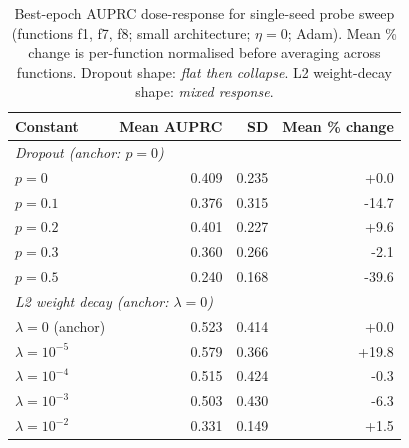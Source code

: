\begin{table}[htbp]
\centering
\caption{Best-epoch AUPRC dose-response for single-seed probe sweep (functions f1, f7, f8; small architecture; $\eta=0$; Adam). Mean \% change is per-function normalised before averaging across functions. Dropout shape: \textit{flat then collapse}. L2 weight-decay shape: \textit{mixed response}.}
\label{tab:dose_response}
\begin{tabular}{lrrr}
\toprule
Constant & Mean AUPRC & SD & Mean \% change \\
\midrule
\multicolumn{4}{l}{\textit{Dropout (anchor: $p=0$)}} \\
\quad $p = 0$ & 0.409 & 0.235 & +0.0 \\
\quad $p = 0.1$ & 0.376 & 0.315 & -14.7 \\
\quad $p = 0.2$ & 0.401 & 0.227 & +9.6 \\
\quad $p = 0.3$ & 0.360 & 0.266 & -2.1 \\
\quad $p = 0.5$ & 0.240 & 0.168 & -39.6 \\
\midrule
\multicolumn{4}{l}{\textit{L2 weight decay (anchor: $\lambda=0$)}} \\
\quad $\lambda = 0$ (anchor) & 0.523 & 0.414 & +0.0 \\
\quad $\lambda = 10^{-5}$ & 0.579 & 0.366 & +19.8 \\
\quad $\lambda = 10^{-4}$ & 0.515 & 0.424 & -0.3 \\
\quad $\lambda = 10^{-3}$ & 0.503 & 0.430 & -6.3 \\
\quad $\lambda = 10^{-2}$ & 0.331 & 0.149 & +1.5 \\
\bottomrule
\end{tabular}
\end{table}
